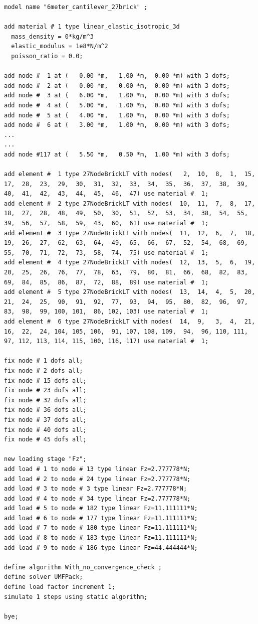 \documentclass[fleqn,11pt]{article}
\begin{document}
%
\begin{lstlisting}
model name "6meter_cantilever_27brick" ;

add material # 1 type linear_elastic_isotropic_3d
  mass_density = 0*kg/m^3
  elastic_modulus = 1e8*N/m^2
  poisson_ratio = 0.0;

add node #  1 at (   0.00 *m,   1.00 *m,  0.00 *m) with 3 dofs;
add node #  2 at (   0.00 *m,   0.00 *m,  0.00 *m) with 3 dofs;
add node #  3 at (   6.00 *m,   1.00 *m,  0.00 *m) with 3 dofs;
add node #  4 at (   5.00 *m,   1.00 *m,  0.00 *m) with 3 dofs;
add node #  5 at (   4.00 *m,   1.00 *m,  0.00 *m) with 3 dofs;
add node #  6 at (   3.00 *m,   1.00 *m,  0.00 *m) with 3 dofs;
...
...
add node #117 at (   5.50 *m,   0.50 *m,  1.00 *m) with 3 dofs;

add element #  1 type 27NodeBrickLT with nodes(   2,  10,  8,  1,  15,  17,  28,  23,  29,  30,  31,  32,  33,  34,  35,  36,  37,  38,  39,  40,  41,  42,  43,  44,  45,  46,  47) use material #  1; 
add element #  2 type 27NodeBrickLT with nodes(  10,  11,  7,  8,  17,  18,  27,  28,  48,  49,  50,  30,  51,  52,  53,  34,  38,  54,  55,  39,  56,  57,  58,  59,  43,  60,  61) use material #  1; 
add element #  3 type 27NodeBrickLT with nodes(  11,  12,  6,  7,  18,  19,  26,  27,  62,  63,  64,  49,  65,  66,  67,  52,  54,  68,  69,  55,  70,  71,  72,  73,  58,  74,  75) use material #  1; 
add element #  4 type 27NodeBrickLT with nodes(  12,  13,  5,  6,  19,  20,  25,  26,  76,  77,  78,  63,  79,  80,  81,  66,  68,  82,  83,  69,  84,  85,  86,  87,  72,  88,  89) use material #  1; 
add element #  5 type 27NodeBrickLT with nodes(  13,  14,  4,  5,  20,  21,  24,  25,  90,  91,  92,  77,  93,  94,  95,  80,  82,  96,  97,  83,  98,  99, 100, 101,  86, 102, 103) use material #  1; 
add element #  6 type 27NodeBrickLT with nodes(  14,  9,   3,  4,  21,  16,  22,  24, 104, 105, 106,  91, 107, 108, 109,  94,  96, 110, 111,  97, 112, 113, 114, 115, 100, 116, 117) use material #  1; 

fix node # 1 dofs all;
fix node # 2 dofs all;
fix node # 15 dofs all;
fix node # 23 dofs all;
fix node # 32 dofs all;
fix node # 36 dofs all;
fix node # 37 dofs all;
fix node # 40 dofs all;
fix node # 45 dofs all;

new loading stage "Fz";
add load # 1 to node # 13 type linear Fz=2.777778*N; 
add load # 2 to node # 24 type linear Fz=2.777778*N; 
add load # 3 to node # 3 type linear Fz=2.777778*N; 
add load # 4 to node # 34 type linear Fz=2.777778*N; 
add load # 5 to node # 182 type linear Fz=11.111111*N; 
add load # 6 to node # 177 type linear Fz=11.111111*N; 
add load # 7 to node # 180 type linear Fz=11.111111*N; 
add load # 8 to node # 183 type linear Fz=11.111111*N; 
add load # 9 to node # 186 type linear Fz=44.444444*N; 

define algorithm With_no_convergence_check ;
define solver UMFPack;
define load factor increment 1;
simulate 1 steps using static algorithm;

bye;
\end{lstlisting}
\end{document}

